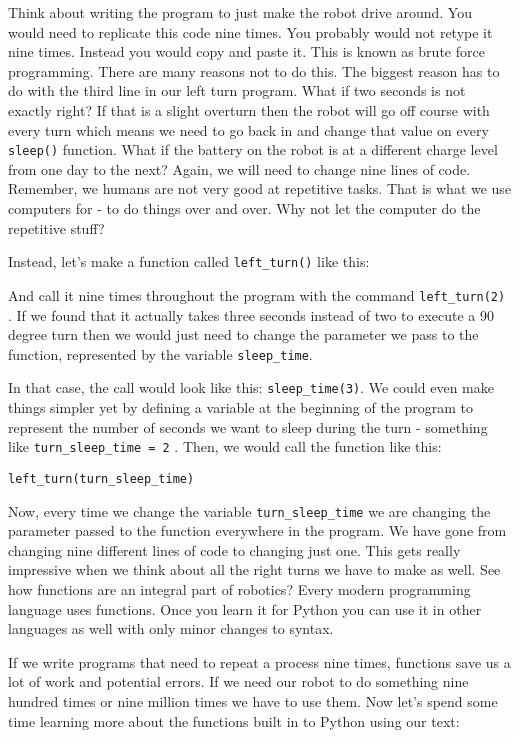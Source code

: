 \documentclass[
]{book}
\begin{document}
Think about writing the program to just make the robot drive around. You would need to replicate this code nine times. You probably would not retype it nine times. Instead you would copy and paste it. This is known as brute force programming. There are many reasons not to do this. The biggest reason has to do with the third line in our left turn program. What if two seconds is not exactly right? If that is a slight overturn then the robot will go off course with every turn which means we need to go back in and change that value on every \texttt{sleep()} function. What if the battery on the robot is at a different charge level from one day to the next? Again, we will need to change nine lines of code. Remember, we humans are not very good at repetitive tasks. That is what we use computers for - to do things over and over. Why not let the computer do the repetitive stuff?

Instead, let's make a function called \texttt{left\_turn()} like this:

And call it nine times throughout the program with the command \texttt{left\_turn(2)} . If we found that it actually takes three seconds instead of two to execute a 90 degree turn then we would just need to change the parameter we pass to the function, represented by the variable \texttt{sleep\_time}.

In that case, the call would look like this: \texttt{sleep\_time(3)}. We could even make things simpler yet by defining a variable at the beginning of the program to represent the number of seconds we want to sleep during the turn - something like \texttt{turn\_sleep\_time\ =\ 2} . Then, we would call the function like this:

\texttt{left\_turn(turn\_sleep\_time)}

Now, every time we change the variable \texttt{turn\_sleep\_time} we are changing the parameter passed to the function everywhere in the program. We have gone from changing nine different lines of code to changing just one. This gets really impressive when we think about all the right turns we have to make as well. See how functions are an integral part of robotics? Every modern programming language uses functions. Once you learn it for Python you can use it in other languages as well with only minor changes to syntax.

If we write programs that need to repeat a process nine times, functions save us a lot of work and potential errors. If we need our robot to do something nine hundred times or nine million times we have to use them. Now let's spend some time learning more about the functions built in to Python using our text:
\end{document}
